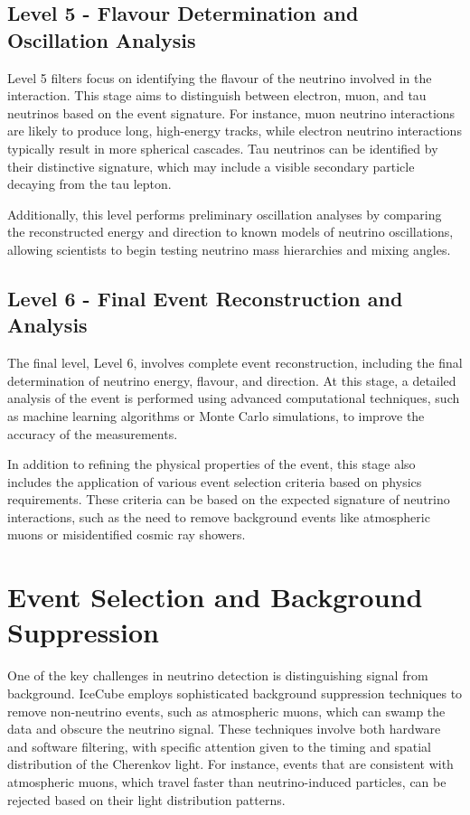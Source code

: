 \documentclass[a4paper,12pt,numbered]{article}
\begin{document}
\subsection{Level 5 - Flavour Determination and Oscillation Analysis}
Level 5 filters focus on identifying the flavour of the neutrino involved in the interaction. This stage aims to distinguish between electron, muon, and tau neutrinos based on the event signature. For instance, muon neutrino interactions are likely to produce long, high-energy tracks, while electron neutrino interactions typically result in more spherical cascades. Tau neutrinos can be identified by their distinctive signature, which may include a visible secondary particle decaying from the tau lepton.

Additionally, this level performs preliminary oscillation analyses by comparing the reconstructed energy and direction to known models of neutrino oscillations, allowing scientists to begin testing neutrino mass hierarchies and mixing angles.

\subsection{Level 6 - Final Event Reconstruction and Analysis}
The final level, Level 6, involves complete event reconstruction, including the final determination of neutrino energy, flavour, and direction. At this stage, a detailed analysis of the event is performed using advanced computational techniques, such as machine learning algorithms or Monte Carlo simulations, to improve the accuracy of the measurements.

In addition to refining the physical properties of the event, this stage also includes the application of various event selection criteria based on physics requirements. These criteria can be based on the expected signature of neutrino interactions, such as the need to remove background events like atmospheric muons or misidentified cosmic ray showers.

\section{Event Selection and Background Suppression}
One of the key challenges in neutrino detection is distinguishing signal from background. IceCube employs sophisticated background suppression techniques to remove non-neutrino events, such as atmospheric muons, which can swamp the data and obscure the neutrino signal. These techniques involve both hardware and software filtering, with specific attention given to the timing and spatial distribution of the Cherenkov light. For instance, events that are consistent with atmospheric muons, which travel faster than neutrino-induced particles, can be rejected based on their light distribution patterns.
\end{document}

